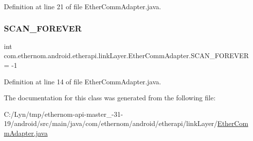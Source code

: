 Definition at line 21 of file Ether\+Comm\+Adapter.\+java.

\mbox{\label{classcom_1_1ethernom_1_1android_1_1etherapi_1_1link_layer_1_1_ether_comm_adapter_a385005a3b6b38c91c05d4dfa00ce85a8}} 
\subsubsection{\texorpdfstring{S\+C\+A\+N\+\_\+\+F\+O\+R\+E\+V\+ER}{SCAN\_FOREVER}}
{\footnotesize\ttfamily int com.\+ethernom.\+android.\+etherapi.\+link\+Layer.\+Ether\+Comm\+Adapter.\+S\+C\+A\+N\+\_\+\+F\+O\+R\+E\+V\+ER = -\/1\hspace{0.3cm}{\ttfamily [static]}}



Definition at line 14 of file Ether\+Comm\+Adapter.\+java.



The documentation for this class was generated from the following file\+:\begin{DoxyCompactItemize}
\item 
C\+:/\+Lyn/tmp/ethernom-\/api-\/master\+\_-\/31-\/19/android/src/main/java/com/ethernom/android/etherapi/link\+Layer/\mbox{\hyperlink{_ether_comm_adapter_8java}{Ether\+Comm\+Adapter.\+java}}\end{DoxyCompactItemize}
